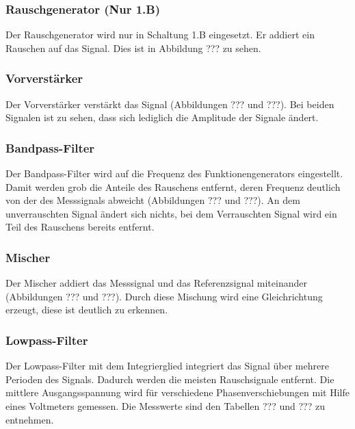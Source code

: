 \documentclass[11pt]{article}
\begin{document}
\subsubsection{Rauschgenerator (Nur 1.B)}
Der Rauschgenerator wird nur in Schaltung 1.B eingesetzt. Er addiert ein Rauschen auf das Signal. Dies ist in Abbildung ??? zu sehen. 
\subsubsection{Vorverstärker}
Der Vorverstärker verstärkt das Signal (Abbildungen ??? und ???). Bei beiden Signalen ist zu sehen, dass sich lediglich die Amplitude der Signale ändert.
\subsubsection{Bandpass-Filter}
Der Bandpass-Filter wird auf die Frequenz des Funktionengenerators eingestellt. Damit werden grob die Anteile des Rauschens entfernt, deren Frequenz deutlich von der des Messsignals abweicht (Abbildungen ??? und ???). An dem unverrauschten Signal ändert sich nichts, bei dem Verrauschten Signal wird ein Teil des Rauschens bereits entfernt.
\subsubsection{Mischer}
Der Mischer addiert das Messsignal und das Referenzsignal miteinander (Abbildungen ??? und ???). Durch diese Mischung wird eine Gleichrichtung erzeugt, diese ist deutlich zu erkennen.
\subsubsection{Lowpass-Filter}
Der Lowpass-Filter mit dem Integrierglied integriert das Signal über mehrere Perioden des Signals. Dadurch werden die meisten Rauschsignale entfernt. Die mittlere Ausgangsspannung wird für verschiedene Phasenverschiebungen mit Hilfe eines Voltmeters gemessen. Die Messwerte sind den Tabellen ??? und ??? zu entnehmen.
\end{document}
